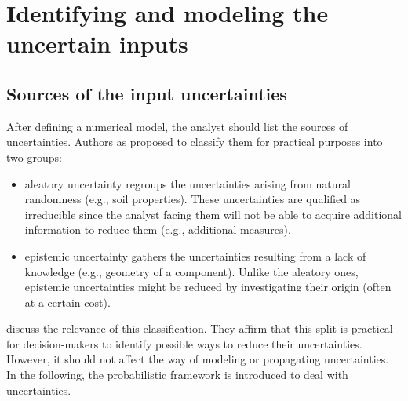 

\section{Identifying and modeling the uncertain inputs} \label{sec:uq}

\subsection{Sources of the input uncertainties}
After defining a numerical model, the analyst should list the sources of uncertainties. 
Authors as \citet{thunnissen_2005} proposed to classify them for practical purposes into two groups:
\begin{itemize}
    \item aleatory uncertainty regroups the uncertainties arising from natural randomness (e.g., soil properties). 
    These uncertainties are qualified as irreducible since the analyst facing them will not be able to acquire additional information to reduce them (e.g., additional measures).     
    \item epistemic uncertainty gathers the uncertainties resulting from a lack of knowledge (e.g., geometry of a component). 
    Unlike the aleatory ones, epistemic uncertainties might be reduced by investigating their origin (often at a certain cost). 
\end{itemize} 

\citet{kiureghian_2009} discuss the relevance of this classification. 
They affirm that this split is practical for decision-makers to identify possible ways to reduce their uncertainties. 
However, it should not affect the way of modeling or propagating uncertainties. 
In the following, the probabilistic framework is introduced to deal with uncertainties. 



